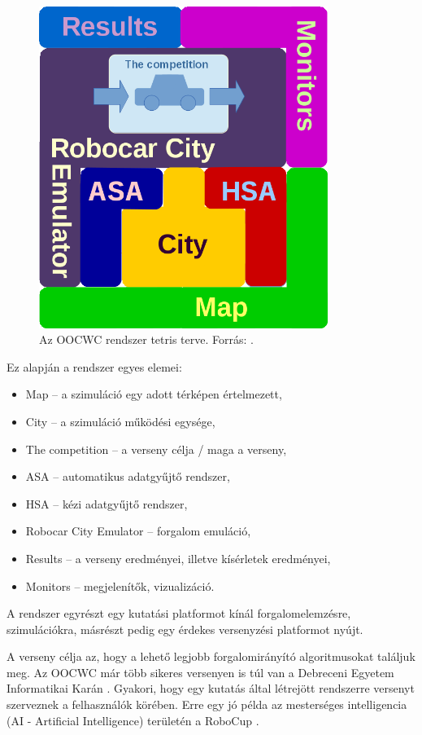 \documentclass[a4paper,12pt]{report}
\begin{document}
\begin{figure}[ht]
\centerline{
\includegraphics[width=3.7in]{img/tetris_plan}}
\caption{Az OOCWC rendszer tetris terve. Forrás: \cite{oocwcrepo}.}
\label{basedesign}
\end{figure}

Ez alapján a rendszer egyes elemei:

\begin{itemize}
\item Map -- a szimuláció egy adott térképen értelmezett,
\item City -- a szimuláció működési egysége,
\item The competition -- a verseny célja / maga a verseny,
\item ASA -- automatikus adatgyűjtő rendszer,
\item HSA -- kézi adatgyűjtő rendszer,
\item Robocar City Emulator -- forgalom emuláció,
\item Results -- a verseny eredményei, illetve kísérletek eredményei,
\item Monitors -- megjelenítők, vizualizáció.
\end{itemize}

A rendszer egyrészt egy kutatási platformot kínál forgalomelemzésre, szimulációkra, másrészt pedig egy érdekes versenyzési platformot nyújt.

\vspace{2mm}
A verseny célja az, hogy a lehető legjobb forgalomirányító algoritmusokat találjuk meg. Az OOCWC már több sikeres versenyen is túl van a Debreceni Egyetem Informatikai Karán \cite{competitions}. Gyakori, hogy egy kutatás által létrejött rendszerre versenyt szerveznek a felhasználók körében. Erre egy jó példa az mesterséges intelligencia (AI - Artificial Intelligence) területén a RoboCup \cite{robocup}.
\end{document}
